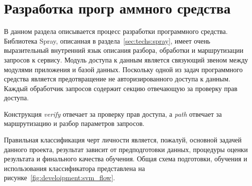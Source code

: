 \section{Разработка прогр
аммного средства}
В данном раздела описывается процесс разработки программного средства.
Библиотека Spray, описанная в раздела~\ref{sec:techs:spray}, имеет очень выразительный внутренний язык описания разбора, обработки и маршрутизации запросов к сервису. Модуль доступа к данным является связующий звеном между модулями приложения и базой данных. Поскольку одной из задач программного средства является предотвращение не авторизированного доступа к данным. Каждый обработчик запросов содержит секцию отвечающую за проверку прав доступа.

Конструкция \emph{verify} отвечает за проверку прав доступа, а \emph{path} отвечает за маршрутизацию и разбор параметров запросов. 

Правильная классификация черт личности является, пожалуй, основной задачей данного проекта, результат зависит от предподготовки данных, процедуры оценки результата и финального качества обучения. Общая схема подготовки, обучения и использования классификатора представлена на рисунке~\ref{fig:develoipment:svm_flow}.

